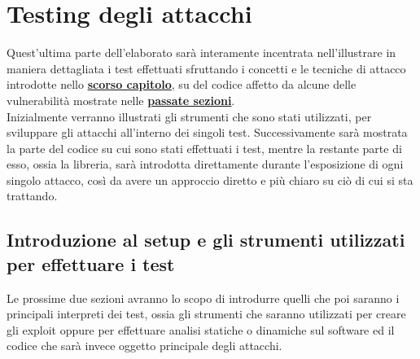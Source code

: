 \chapter{Testing degli attacchi}
\label{chap:Test}
Quest'ultima parte dell'elaborato sarà interamente incentrata nell'illustrare in maniera dettagliata i test effettuati sfruttando i concetti e le tecniche di attacco introdotte nello \hyperref[chap:Attacks]{\textbf{scorso capitolo}}, su del codice affetto da alcune delle vulnerabilità mostrate nelle \hyperref[sec:Vulnerabilita]{\textbf{passate sezioni}}.\\
Inizialmente verranno illustrati gli strumenti che sono stati utilizzati, per sviluppare gli attacchi all'interno dei singoli test. Successivamente sarà mostrata la parte del codice su cui sono stati effettuati i test, mentre la restante parte di esso, ossia la libreria, sarà introdotta direttamente durante l'esposizione di ogni singolo attacco, così da 
avere un approccio diretto e più chiaro su ciò di cui si sta trattando.

\section{Introduzione al setup e gli strumenti utilizzati per effettuare i test}
\label{sec:Tools-setup}
Le prossime due sezioni avranno lo scopo di introdurre quelli che poi saranno i principali interpreti dei test, ossia gli strumenti che saranno utilizzati per creare gli exploit oppure per effettuare analisi statiche o dinamiche sul software ed il codice che sarà invece oggetto principale degli attacchi.

